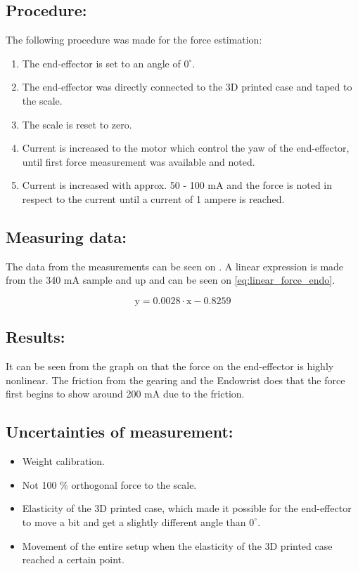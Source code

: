 \subsection*{Procedure:}
The following procedure was made for the force estimation:
\begin{enumerate}
\item The end-effector is set to an angle of $0^\circ$.
\item The end-effector was directly connected to the 3D printed case and taped to the scale.
\item The scale is reset to zero.
\item Current is increased to the motor which control the yaw of the end-effector, until first force measurement was available and noted.
\item Current is increased with approx. 50 - 100 mA and the force is noted in respect to the current until a current of 1 ampere is reached.
\end{enumerate}


\subsection*{Measuring data:}
The data from the measurements can be seen on . A linear expression is made from the 340 mA sample and up and can be seen on \eqref{eq:linear_force_endo}.

\begin{equation}
\text{y} = 0.0028 \cdot \text{x} -0.8259 
\label{eq:linear_force_endo}
\end{equation} 



\subsection*{Results:}
It can be seen from the graph on  that the force on the end-effector is highly nonlinear. The friction from the gearing and the Endowrist does that the force first begins to show around 200 mA due to the friction.

\subsection*{Uncertainties of measurement:}
\begin{itemize}
\item Weight calibration.
\item Not 100 \% orthogonal force to the scale.
\item Elasticity of the 3D printed case, which made it possible for the end-effector to move a bit and get a slightly different angle than $0^\circ$. 
\item Movement of the entire setup when the elasticity of the 3D printed case reached a certain point.
\end{itemize}

